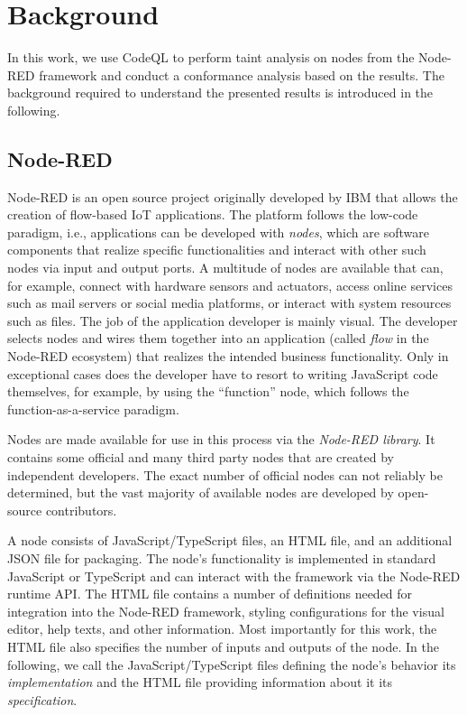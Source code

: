 \section{Background}
\label{sec:background}

In this work, we use CodeQL to perform taint analysis on nodes from the Node-RED framework and conduct a conformance analysis based on the results.
The background required to understand the presented results is introduced in the following.


\subsection{Node-RED}
\label{sub:node_red}


Node-RED is an open source project originally developed by IBM that allows the creation of flow-based IoT applications.
The platform follows the low-code paradigm, i.e., applications can be developed with \textit{nodes}, which are software components that realize specific functionalities and interact with other such nodes via input and output ports.
A multitude of nodes are available that can, for example, connect with hardware sensors and actuators, access online services such as mail servers or social media platforms, or interact with system resources such as files.
The job of the application developer is mainly visual.
The developer selects nodes 
and wires them together into an application (called \textit{flow} in the Node-RED ecosystem) 
that realizes the intended business functionality.
Only in exceptional cases does the developer have to resort to writing JavaScript code themselves, for example, by using the ``function'' node, which follows the function-as-a-service paradigm.

Nodes are made available for use in this process via the \textit{Node-RED library}. 
It contains some official and many third party nodes that are created by independent developers.
The exact number of official nodes can not reliably be determined, but the vast majority of available nodes are developed by open-source contributors.


A node consists of JavaScript/TypeScript files, an HTML file, and an additional JSON file for packaging.
The node's functionality is implemented in standard JavaScript or TypeScript and can interact with the framework via the Node-RED runtime API.
The HTML file contains a number of definitions needed for integration into the Node-RED framework, styling configurations for the visual editor, help texts, and other information.
Most importantly for this work, the HTML file also specifies the number of inputs and outputs of the node.
In the following, we call the JavaScript/TypeScript files defining the node's behavior its \textit{implementation} and the HTML file providing information about it its \textit{specification}.

